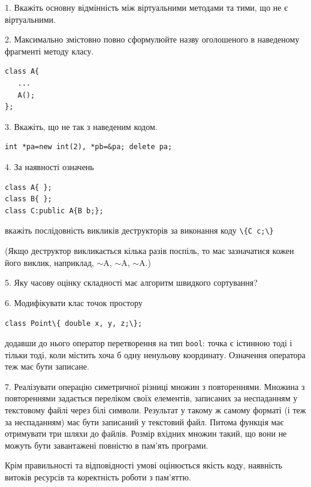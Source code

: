 \documentclass[12pt, ukrainian]{article}
\def\code#1{\Verb!#1!}
\begin{document}
{%
1. Вкажіть основну відмінність між віртуальними методами та тими, що не є віртуальними.%
\par
\vspace{2mm}
2. Максимально змістовно повно сформулюйте назву оголошеного в наведеному фрагменті методу класу.
\vspace{-3mm}
\begin{verbatim}class A{
   ...
   A();
};\end{verbatim}
\vspace{-3mm}
\par
\vspace{2mm}
3. Вкажіть, що не так з наведеним кодом.
\vspace{-3mm}
\begin{verbatim}int *pa=new int(2), *pb=&pa; delete pa;\end{verbatim}
\vspace{-3mm}
\par
\vspace{2mm}
4. За наявності означень
\vspace{-3mm}
\begin{verbatim}
class A{ };
class B{ };
class C:public A{B b;};\end{verbatim}
\vspace{-3mm}
вкажіть послідовність викликів деструкторів за виконання коду \code{\{C c;\}} 

(Якщо деструктор викликається кілька разів поспіль, то має зазначатися кожен його виклик, наприклад, $\sim$A, $\sim$A, $\sim$A.)

\vspace{2mm}
5. Яку часову оцінку складності має алгоритм швидкого сортування?
\par
\vspace{2mm}
6. Модифікувати клас точок простору 

\qquad\code{class Point\{ double x, y, z;\};}


додавши до нього оператор перетворення на тип \code{bool}: точка є істинною тоді і тільки тоді, коли містить хоча б одну ненульову координату. Означення оператора теж має бути записане.%
\par
\vspace{2mm}
7. 
Реалізувати операцію симетричної різниці множин з повтореннями. Множина з повтореннями задається переліком своїх елементів, записаних за неспаданням у текстовому файлі через білі символи. Результат у такому ж самому форматі (і теж за неспаданням) має бути записаний у текстовий файл. Питома функція має отримувати три шляхи до файлів. Розмір вхідних множин такий, що вони не можуть бути завантажені повністю в пам’ять програми.

Крім правильності та відповідності умові оцінюється якість коду, наявність витоків ресурсів та коректність роботи з пам'яттю. 

}
\end{document}
